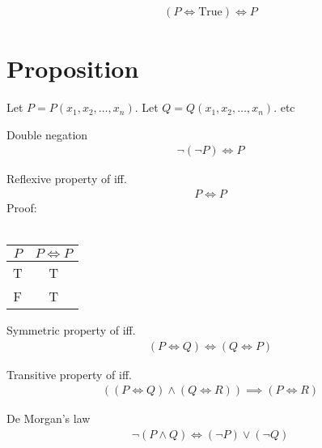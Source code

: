 \begin{prop}
\begin{align*}
(P \iff \text{True}) \iff P
\end{align*}
\end{prop}

\section{Proposition}
Let $P = P(x_1, x_2, \dots, x_n)$.
Let $Q = Q(x_1, x_2, \dots, x_n)$.
etc

\begin{prop}
\label{Proposition:double_negation}
Double negation
\begin{align*}
\lnot (\lnot P) \iff P
\end{align*}
\end{prop}

\begin{prop}
\label{Proposition:iff_reflexive}
Reflexive property of iff.
\begin{align*}
P \iff P
\end{align*}
Proof: \\ \\
\begin{tabular}{|c|c|}
\hline
$P$ & $P \iff P$ \\
\hline
T & T \\
\hline
F & T \\
\hline
\end{tabular}
\end{prop}

\begin{prop}
\label{Proposition:iff_symmetric}
Symmetric property of iff.
\begin{align*}
(P \iff Q) \iff (Q \iff P)
\end{align*}
\end{prop}

\begin{prop}
\label{Proposition:iff_transitive}
Transitive property of iff.
\begin{align*}
((P \iff Q) \land (Q \iff R)) \implies (P \iff R)
\end{align*}
\end{prop}

\begin{prop}
\label{Proposition:De_Morgan_1}
De Morgan's law
\begin{align*}
\lnot (P \land Q) \iff (\lnot P) \lor (\lnot Q) \\
\end{align*}
\end{prop}

